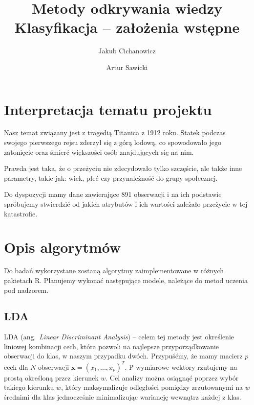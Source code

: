 \documentclass{article}
\newcommand{\ang}[1]{ang.~{\itshape #1}}
\begin{document}
\title{Metody odkrywania wiedzy \\%
{\large Klasyfikacja -- założenia wstępne} }

\author{Jakub Cichanowicz \and Artur Sawicki}

\maketitle

\section{Interpretacja tematu projektu}
Nasz temat związany jest z tragedią Titanica z 1912 roku. Statek podczas swojego pierwszego rejsu zderzył się z górą lodową, co spowodowało jego zatonięcie oraz śmierć większości osób znajdujących się na nim.

Prawda jest taka, że o przeżyciu nie zdecydowało tylko szczęście, ale także inne parametry, takie jak: wiek, płeć czy przynależność do grupy społecznej.

Do dyspozycji mamy dane zawierające 891 obserwacji i na ich podstawie spróbujemy stwierdzić od jakich atrybutów i ich wartości zależało przeżycie w tej katastrofie.

\section{Opis algorytmów}
Do badań wykorzystane zostaną algorytmy zaimplementowane w różnych pakietach R. Planujemy wykonać następujące modele, należące do metod uczenia pod nadzorem.

\subsection{LDA}
LDA (\ang{Linear Discriminant Analysis}) -- celem tej metody jest określenie liniowej kombinacji cech, która pozwoli na najlepsze przyporządkowanie obserwacji do klas, w naszym przypadku dwóch. Przypuśćmy, że mamy macierz $p$ cech dla $N$ obserwacji $\mathbf{x}=(x_{1},...,x_{p})^{T}$. P-wymiarowe wektory rzutujemy na prostą określoną przez kierunek $w$. Cel analizy można osiągnąć poprzez wybór takiego kierunku $w$, który maksymalizuje odległości pomiędzy zrzutowanymi na $w$ średnimi dla klas jednocześnie minimalizując wariancję wewnątrz każdej z klas.
\end{document}
